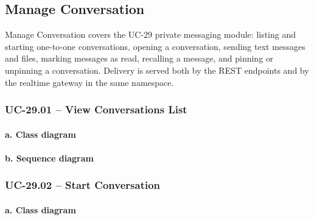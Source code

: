 

\subsection{Manage Conversation}

Manage Conversation covers the UC-29 private messaging module: listing and
starting one-to-one conversations, opening a conversation, sending text
messages and files, marking messages as read, recalling a message, and
pinning or unpinning a conversation. Delivery is served both by the REST
endpoints and by the realtime gateway in the same namespace.

\subsubsection{UC-29.01 -- View Conversations List}

\paragraph*{a. Class diagram}

\paragraph*{b. Sequence diagram}

\subsubsection{UC-29.02 -- Start Conversation}

\paragraph*{a. Class diagram}


